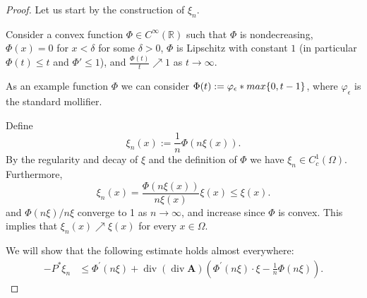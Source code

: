 \documentclass[10pt,a4paper]{amsart}
\newcommand{\A}{\mathbf{A}}
\newcommand*\Div{\operatorname{div}}
\begin{document}
\begin{proof}
    \smallskip
    \noindent
    Let us start by the construction of $\xi_n$.
    
     Consider a convex function $\Phi\in C^\infty (\mathbb{R})$ such that $\Phi$ is nondecreasing, $\Phi(x)= 0$ for $x<\delta$ for some $\delta>0$, $\Phi$ is Lipschitz with constant $1$ (in particular  $\Phi(t)\le t$ and $\Phi' \leq 1$),  
     and $\frac{\Phi(t)}{t}\nearrow 1$ as $t\to \infty$.

     As an example function $\Phi$ we can consider $\Phi (t):= \varphi_\epsilon * {\rm max}\{ 0, t-1\}$, where $\varphi_\epsilon$ is the standard mollifier.

    Define 
    $$
        \xi_n(x):= \frac{1}{n}\Phi (n\xi (x)) .
    $$
    By the regularity and decay of $\xi$ and the definition of $\Phi$ we have $\xi_n\in C^1_c(\Omega)$. 
    Furthermore, 
    $$
        \xi_n (x) = \frac{\Phi (n\xi (x))}{n\xi (x)}\xi (x) \le \xi(x).
    $$
    and $\Phi(n\xi)/n\xi$ converge to 1 as $n\to \infty$, and increase since $\Phi$ is convex. This implies that 
    $
        \xi_n(x)\nearrow \xi (x)
    $
    for every $x\in \Omega$.
    
    
    We will show that
     the following estimate holds almost everywhere:
    \begin{align*}
    - P^*\xi_n &\le \Phi^{'}(n\xi) + \Div(\Div\A)(\Phi^{'}(n\xi)\cdot\xi-\frac{1}{n}\Phi(n\xi)).
    \end{align*}
    

\end{proof}
\end{document}
